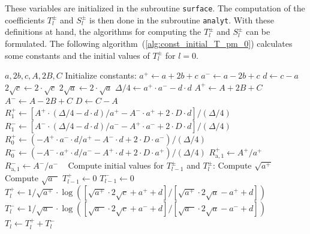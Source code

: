 These variables are initialized in the subroutine \texttt{surface}.
The computation of the coefficients $T^{\pm}_l$ and $S^{\pm}_l$ is then done in the subroutine \texttt{analyt}.
With these definitions at hand, the algorithms for computing the $T^{\pm}_l$ and $S^{\pm}_l$ can be formulated.
The following algorithm~(\ref{alg:const_initial_T_pm_0}) calculates some constants and the initial values of $T^{\pm}_l$ for $l=0$.
\begin{algorithm}
\caption{Calculate constants needed for and initial values of $T^{\pm}_l$}
\label{alg:const_initial_T_pm_0}
\begin{algorithmic}
\Require $a, 2b, c, A, 2B, C$
\State Initialize constants:
\State $a^{+} \gets a + 2b + c$
\State $a^{-} \gets a - 2b + c$
\State $d \gets c-a$
\State $2\sqrt{c} \gets 2 \cdot \sqrt{c}$
\State $2\sqrt{a} \gets 2 \cdot \sqrt{a}$
\State $\Delta/4 \gets a^{+} \cdot a^{-} - d \cdot d$
\State $A^{+} \gets A + 2B + C$
\State $A^{-} \gets A - 2B + C$
\State $D \gets C - A$
\State $R^{+}_1 \gets \left[  A^{+} \cdot (\Delta/4 - d \cdot d)/a^{+} - A^{-} \cdot a^{+} + 2 \cdot D \cdot d \right]/(\Delta/4)$
\State $R^{-}_1 \gets \left[  A^{-} \cdot (\Delta/4 - d \cdot d)/a^{-} - A^{+} \cdot a^{-} + 2 \cdot D \cdot d \right]/(\Delta/4)$
\State $R^{+}_0 \gets \left( -A^{+} \cdot a^{-} \cdot d / a^{+} - A^{-} \cdot d + 2 \cdot D \cdot a^{-} \right)/(\Delta/4)$
\State $R^{-}_0 \gets \left( -A^{-} \cdot a^{+} \cdot d / a^{-} - A^{+} \cdot d + 2 \cdot D \cdot a^{+} \right)/(\Delta/4)$
\State $R^{+}_{\mathrm{a},1} \gets A^{+} / a^{+}$
\State $R^{-}_{\mathrm{a},1} \gets A^{-} / a^{-}$
\State ~
\State Compute initial values for $T^{\pm}_{l-1}$ and $T^{\pm}_l$:
\State Compute $\sqrt{a^{+}}$
\State Compute $\sqrt{a^{-}}$
\State $T^{+}_{l-1} \gets 0$
\State $T^{-}_{l-1} \gets 0$
\State $T^{+}_l \gets 1/\sqrt{a^{+}} \cdot \log\left( \left[ \sqrt{a^{+}} \cdot 2\sqrt{c} + a^{+} + d \right]/\left[ \sqrt{a^{+}} \cdot 2\sqrt{a} - a^{+} + d \right] \right)$
\State $T^{-}_l \gets 1/\sqrt{a^{-}} \cdot \log\left( \left[ \sqrt{a^{-}} \cdot 2\sqrt{c} + a^{-} + d \right]/\left[ \sqrt{a^{-}} \cdot 2\sqrt{a} - a^{-} + d \right] \right)$
\State $T_l \gets T^{+}_l + T^{-}_l$
\end{algorithmic}
\end{algorithm}

